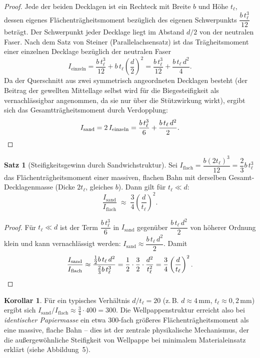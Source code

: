 ﻿\documentclass[a4paper,12pt]{article}
\theoremstyle{definition}
\newtheorem{satz}{Satz}
\newtheorem{korollar}{Korollar}
\begin{document}
\begin{proof}
	Jede der beiden Decklagen ist ein Rechteck mit Breite $b$ und Höhe
	$t_\ell$, dessen eigenes Flächenträgheitsmoment bezüglich des eigenen
	Schwerpunkts $\dfrac{b\,t_\ell^3}{12}$ beträgt. Der Schwerpunkt jeder
	Decklage liegt im Abstand $d/2$ von der neutralen Faser. Nach dem
	Satz von Steiner (Parallelachsensatz) ist das Trägheitsmoment einer
	einzelnen Decklage bezüglich der neutralen Faser
	\[
		I_{\text{einzeln}} = \frac{b\,t_\ell^3}{12} + b\,t_\ell \left(\frac{d}{2}\right)^2
		= \frac{b\,t_\ell^3}{12} + \frac{b\,t_\ell\,d^2}{4}.
	\]
	Da der Querschnitt aus zwei symmetrisch angeordneten Decklagen besteht
	(der Beitrag der gewellten Mittellage selbst wird für die Biegesteifigkeit
	als vernachlässigbar angenommen, da sie nur über die Stützwirkung wirkt),
	ergibt sich das Gesamtträgheitsmoment durch Verdopplung:
	\[
		I_{\mathrm{sand}} = 2\,I_{\text{einzeln}}
		= \frac{b\,t_\ell^3}{6} + \frac{b\,t_\ell\,d^2}{2}. \qedhere
	\]
\end{proof}

\begin{satz}[Steifigkeitsgewinn durch Sandwichstruktur]
	\label{satz:steifigkeit}
	Sei $I_{\mathrm{flach}} = \dfrac{b(2t_\ell)^3}{12} = \dfrac{2}{3}b\,t_\ell^3$
	das Flächenträgheitsmoment einer massiven, flachen Bahn mit derselben
	Gesamt-Decklagenmasse (Dicke $2t_\ell$, gleiches $b$). Dann gilt für
	$t_\ell \ll d$:
	\[
		\frac{I_{\mathrm{sand}}}{I_{\mathrm{flach}}}
		\;\approx\; \frac{3}{4}\left(\frac{d}{t_\ell}\right)^2.
	\]
\end{satz}

\begin{proof}
	Für $t_\ell \ll d$ ist der Term $\dfrac{b\,t_\ell^3}{6}$ in
	$I_{\mathrm{sand}}$ gegenüber $\dfrac{b\,t_\ell\,d^2}{2}$ von
	höherer Ordnung klein und kann vernachlässigt werden:
	$I_{\mathrm{sand}} \approx \dfrac{b\,t_\ell\,d^2}{2}$. Damit
	\[
		\frac{I_{\mathrm{sand}}}{I_{\mathrm{flach}}}
		\approx \frac{\frac{1}{2}b\,t_\ell\,d^2}{\frac{2}{3}b\,t_\ell^3}
		= \frac{1}{2} \cdot \frac{3}{2} \cdot \frac{d^2}{t_\ell^2}
		= \frac{3}{4}\left(\frac{d}{t_\ell}\right)^2. \qedhere
	\]
\end{proof}

\begin{korollar}
	Für ein typisches Verhältnis $d/t_\ell = 20$ (z.\,B. $d \approx 4\,\mathrm{mm}$,
	$t_\ell \approx 0{,}2\,\mathrm{mm}$) ergibt sich
	$I_{\mathrm{sand}}/I_{\mathrm{flach}} \approx \tfrac{3}{4}\cdot 400 = 300$.
	Die Wellpappenstruktur erreicht also bei \emph{identischer Papiermasse} ein
	etwa $300$-fach größeres Flächenträgheitsmoment als eine massive, flache
	Bahn -- dies ist der zentrale physikalische Mechanismus, der die
	außergewöhnliche Steifigkeit von Wellpappe bei minimalem Materialeinsatz
	erklärt (siehe Abbildung~5).
\end{korollar}
\end{document}
